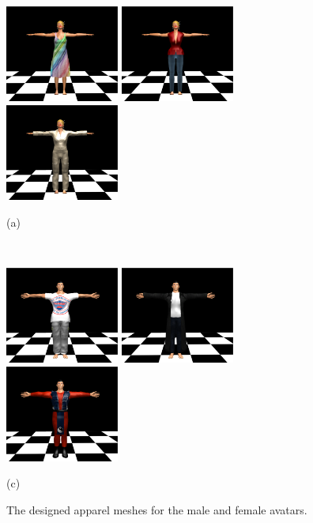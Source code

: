 \begin{figure}[htbp] 
	\centerline{
	\includegraphics[width=0.333\textwidth]{./figures/sundress.eps}
	\includegraphics[width=0.333\textwidth]{./figures/jeans.eps}
	\includegraphics[width=0.333\textwidth]{./figures/flight.eps}
	}
	\centerline{(a)}
	\centerline{\ }
	\centerline{
	\includegraphics[width=0.333\textwidth]{./figures/shirt.eps}
	\includegraphics[width=0.333\textwidth]{./figures/duster.eps}
	\includegraphics[width=0.333\textwidth]{./figures/martial.eps}
	}
	\centerline{(c)}
	\caption{The designed apparel meshes for the male and female avatars.}
	\label{fig:apparels}
\end{figure}
